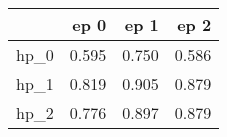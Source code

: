 \begin{tabular}{lrrr}
\toprule
{} &   ep 0 &   ep 1 &   ep 2 \\
\midrule
hp\_0 &  0.595 &  0.750 &  0.586 \\
hp\_1 &  0.819 &  0.905 &  0.879 \\
hp\_2 &  0.776 &  0.897 &  0.879 \\
\bottomrule
\end{tabular}
